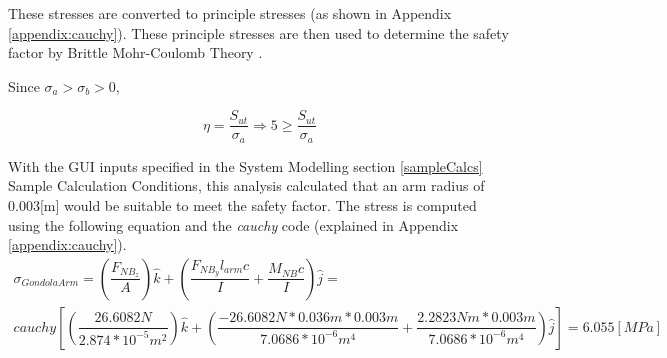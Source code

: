 \documentclass[../main.tex]{subfiles}
\begin{document}
These stresses are converted to principle stresses (as shown in Appendix \ref{appendix:cauchy}). These principle stresses are then used to determine the safety factor by Brittle Mohr-Coulomb Theory \cite[227]{shigley}.

Since $\sigma _a > \sigma _b > 0$,

\begin{equation}
	\eta = \dfrac{S_{ut}}{\sigma _a} \Rightarrow 5 \geq \dfrac{S_{ut}}{\sigma _a}
\end{equation}

With the GUI inputs specified in the System Modelling section \ref{sampleCalcs} Sample Calculation Conditions, this analysis calculated that an arm radius of 0.003[m] would be suitable to meet the safety factor. The stress is computed using the following equation and the \textit{cauchy} code (explained in Appendix \ref{appendix:cauchy}).
\begin{multline}
\sigma _{Gondola Arm}  = \left(\dfrac{F_{NB_{z}}}{A}\right)\hat{k} + \left(\dfrac{F_{NB_{y}}l_{arm}c}{I}  + \dfrac{M_{NB}c}{I} \right) \hat{j} = \\ cauchy\left[\left(\dfrac{26.6082N}{2.874*10^{-5}m^2}\right)\hat{k} + \left(\dfrac{-26.6082N*0.036m*0.003m}{7.0686*10^{-6}m^4}  + \dfrac{2.2823Nm*0.003m}{7.0686*10^{-6}m^4} \right) \hat{j}\right] = 6.055 [MPa] 
\end{multline} 
\end{document}
